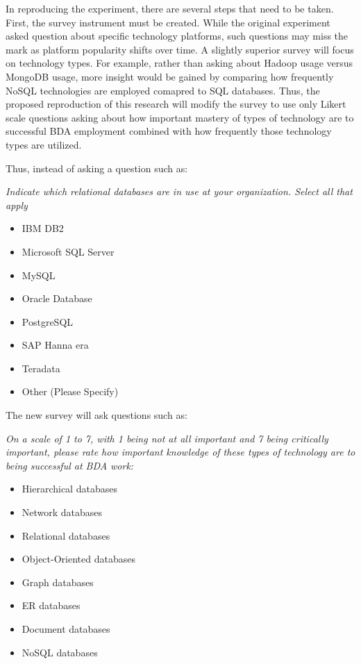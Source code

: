 In reproducing the experiment, there are several steps that need to be taken. First, the survey instrument must be created. While the original experiment asked question about specific technology platforms, such questions may miss the mark as platform popularity shifts over time. A slightly superior survey will focus on technology types. For example, rather than asking about Hadoop usage versus MongoDB usage, more insight would be gained by comparing how frequently NoSQL technologies are employed comapred to SQL databases. Thus, the proposed reproduction of this research will modify the survey to use only Likert scale questions asking about how important mastery of types of technology are to successful BDA employment combined with how frequently those technology types are utilized.

Thus, instead of asking a question such as:

\textit{Indicate which relational databases are in use at your organization. Select all that apply}

\begin{itemize}
  \item IBM DB2
  \item Microsoft SQL Server
  \item MySQL
  \item Oracle Database
  \item PostgreSQL
  \item SAP Hanna
  era\item Teradata
  \item Other (Please Specify)
\end{itemize}

The new survey will ask questions such as:

\textit{On a scale of 1 to 7, with 1 being not at all important and 7 being critically important, please rate how important knowledge of these types of technology are to being successful at BDA work:}

\begin{itemize}
  \item Hierarchical databases
  \item Network databases
  \item Relational databases
  \item Object-Oriented databases
  \item Graph databases
  \item ER databases
  \item Document databases
  \item NoSQL databases
\end{itemize}

